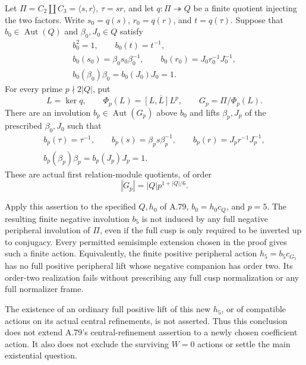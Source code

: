 Let \(\Pi=C_2\amalg C_3=\langle s,r\rangle\),
\(\tau=sr\), and let \(q:\Pi\twoheadrightarrow Q\) be a finite
quotient injecting the two factors. Write \(s_0=q(s)\),
\(r_0=q(r)\), and \(t=q(\tau)\). Suppose that
\(b_0\in\operatorname{Aut}(Q)\) and \(\beta_0,J_0\in Q\) satisfy
\[
 \begin{gathered}
 b_0^2=1,\qquad b_0(t)=t^{-1},\\
 b_0(s_0)=\beta_0s_0\beta_0^{-1},\qquad
 b_0(r_0)=J_0r_0^{-1}J_0^{-1},\\
 b_0(\beta_0)\beta_0=b_0(J_0)J_0=1.
 \end{gathered}
 \tag{A.80.1}
\]
For every prime \(p\nmid2|Q|\), put
\[
 L=\ker q,\qquad
 \Phi_p(L)=\overline{[L,L]L^p},\qquad
 G_p=\Pi/\Phi_p(L).
 \tag{A.80.2}
\]
There are an involution \(b_p\in\operatorname{Aut}(G_p)\)
above \(b_0\) and lifts \(\beta_p,J_p\) of the prescribed
\(\beta_0,J_0\) such that
\[
 \begin{gathered}
 b_p(\tau)=\tau^{-1},\qquad
 b_p(s)=\beta_ps\beta_p^{-1},\qquad
 b_p(r)=J_pr^{-1}J_p^{-1},\\
 b_p(\beta_p)\beta_p=b_p(J_p)J_p=1.
 \end{gathered}
 \tag{A.80.3}
\]
These are actual first relation-module quotients, of order
\[
                      |G_p|=|Q|p^{1+|Q|/6}.
 \tag{A.80.4}
\]

Apply this assertion to the specified \(Q,h_0\) of A.79,
\(b_0=h_0c_Q\), and \(p=5\). The resulting finite negative
involution \(b_5\) is not induced by any full negative peripheral
involution of \(\Pi\), even if the full cusp is only required to
be inverted up to conjugacy. Every permitted semisimple extension
chosen in the proof gives such a finite action. Equivalently, the finite positive
peripheral action \(h_5=b_5c_{G_5}\) has no full positive
peripheral lift whose negative companion has order two. Its
order-two realization fails without prescribing any full cusp
normalization or any full normalizer frame.

The existence of an ordinary full positive lift of this new
\(h_5\), or of compatible actions on its actual central
refinements, is not asserted. Thus this conclusion does not
extend A.79's central-refinement assertion to a newly chosen
coefficient action. It also does not exclude the surviving
\(W=0\) actions or settle the main existential question.


